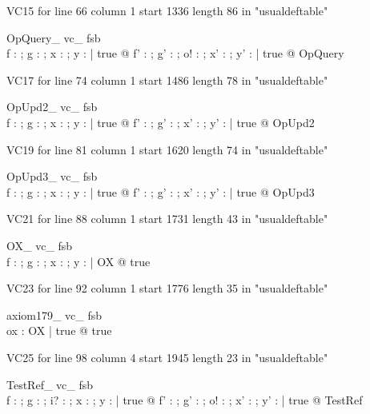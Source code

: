 \documentclass{article}
\begin{document}
VC15 for line 66 column 1 start 1336 length 86 in "usualdeftable"
\begin{theorem}{ OpQuery\_ vc\_ fsb}\\
 \forall f : \nat \pfun \nat ; g : \nat ; x : \nat ; y : \power \nat | true @ \exists f' : \nat \pfun \nat ; g' : \nat ; o! : \nat ; x' : \nat ; y' : \power \nat | true @ OpQuery \\

\end{theorem}

VC17 for line 74 column 1 start 1486 length 78 in "usualdeftable"
\begin{theorem}{ OpUpd2\_ vc\_ fsb}\\
 \forall f : \nat \pfun \nat ; g : \nat ; x : \nat ; y : \power \nat | true @ \exists f' : \nat \pfun \nat ; g' : \nat ; x' : \nat ; y' : \power \nat | true @ OpUpd2 \\

\end{theorem}

VC19 for line 81 column 1 start 1620 length 74 in "usualdeftable"
\begin{theorem}{ OpUpd3\_ vc\_ fsb}\\
 \forall f : \nat \pfun \nat ; g : \nat ; x : \nat ; y : \power \nat | true @ \exists f' : \nat \pfun \nat ; g' : \nat ; x' : \nat ; y' : \power \nat | true @ OpUpd3 \\

\end{theorem}

VC21 for line 88 column 1 start 1731 length 43 in "usualdeftable"
\begin{theorem}{ OX\_ vc\_ fsb}\\
 \exists f : \nat \pfun \nat ; g : \nat ; x : \nat ; y : \power \nat | OX @ true \\

\end{theorem}

VC23 for line 92 column 1 start 1776 length 35 in "usualdeftable"
\begin{theorem}{ axiom179\_ vc\_ fsb}\\
 \exists ox : OX | true @ true \\

\end{theorem}

VC25 for line 98 column 4 start 1945 length 23 in "usualdeftable"
\begin{theorem}{ TestRef\_ vc\_ fsb}\\
 \forall f : \nat \pfun \nat ; g : \nat ; i? : \nat ; x : \nat ; y : \power \nat | true @ \exists f' : \nat \pfun \nat ; g' : \nat ; o! : \nat ; x' : \nat ; y' : \power \nat | true @ TestRef \\

\end{theorem}
\end{document}
